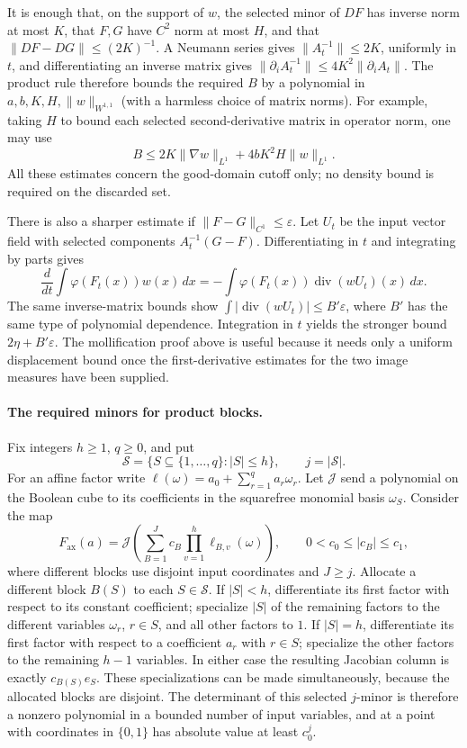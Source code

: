 \begin{remark}\label{cube:perturbation-cost}
It is enough that, on the support of $w$, the selected minor of $DF$ has
inverse norm at most $K$, that $F,G$ have $C^2$ norm at most $H$, and that
$\|DF-DG\|\leq(2K)^{-1}$. A Neumann series gives
$\|A_t^{-1}\|\leq2K$, uniformly in $t$, and differentiating an inverse
matrix gives
$\|\partial_i A_t^{-1}\|\leq4K^2\|\partial_i A_t\|$.
The product rule therefore bounds the required $B$ by a polynomial in
$a,b,K,H,\|w\|_{W^{1,1}}$ (with a harmless choice of matrix norms).
For example, taking $H$ to bound each selected second-derivative
matrix in operator norm, one may use
\[
 B\le 2K\|\nabla w\|_{L^1}
          +4bK^2H\|w\|_{L^1}.
\]
All these estimates concern the good-domain cutoff only; no density bound
is required on the discarded set.

There is also a sharper estimate if $\|F-G\|_{C^1}\leq\varepsilon$.
Let $U_t$ be the input vector field with selected components
$A_t^{-1}(G-F)$. Differentiating in $t$ and integrating by parts gives
\[
 \frac{d}{dt}\int\varphi(F_t(x))w(x)\,dx
 =-\int\varphi(F_t(x))\operatorname{div}(wU_t)(x)\,dx.
\]
The same inverse-matrix bounds show
$\int|\operatorname{div}(wU_t)|\leq B'\varepsilon$, where $B'$ has the
same type of polynomial dependence. Integration in $t$ yields the
stronger bound $2\eta+B'\varepsilon$. The mollification proof above is
useful because it needs only a uniform displacement bound once the
first-derivative estimates for the two image measures have been supplied.
\end{remark}

\paragraph{The required minors for product blocks.}
Fix integers $h\geq1$, $q\geq0$, and put
\[
 \mathcal S=\{S\subseteq\{1,\ldots,q\}:|S|\leq h\},
 \qquad j=|\mathcal S|.
\]
For an affine factor write
$\ell(\omega)=a_0+\sum_{r=1}^q a_r\omega_r$.
Let $\mathcal J$ send a polynomial on the Boolean cube to its coefficients
in the squarefree monomial basis $\omega_S$. Consider the map
\[
 F_{\mathrm{ax}}(a)
   =\mathcal J\left(\sum_{B=1}^{J}
               c_B\prod_{v=1}^h\ell_{B,v}(\omega)\right),
 \qquad 0<c_0\leq |c_B|\leq c_1,
\]
where different blocks use disjoint input coordinates and $J\geq j$.
Allocate a different block $B(S)$ to each $S\in\mathcal S$.
If $|S|<h$, differentiate its first factor with respect to its constant
coefficient; specialize $|S|$ of the remaining factors to the different
variables $\omega_r$, $r\in S$, and all other factors to $1$.
If $|S|=h$, differentiate its first factor with respect to a coefficient
$a_r$ with $r\in S$; specialize the other factors to the remaining
$h-1$ variables. In either case the resulting Jacobian column is exactly
$c_{B(S)}e_S$. These specializations can be made simultaneously, because
the allocated blocks are disjoint. The determinant of this selected
$j$-minor is therefore a nonzero polynomial in a bounded number of input
variables, and at a point with coordinates in $\{0,1\}$ has absolute
value at least $c_0^j$.

